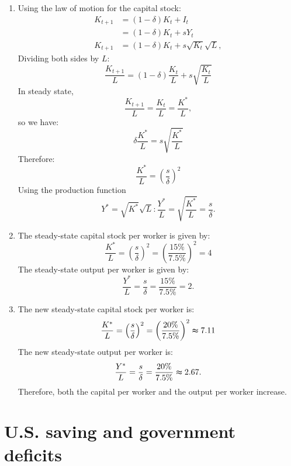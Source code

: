 \documentclass[]{book}
\theoremstyle{definition}
\theoremstyle{definition}
\theoremstyle{definition}
\theoremstyle{remark}
\begin{document}
\begin{enumerate}
\def\labelenumi{\arabic{enumi}.}
\item
  Using the law of motion for the capital stock: \[\begin{aligned}
  K_{t+1}&=(1-\delta)K_{t}+I_{t}\\
  &=(1-\delta)K_{t}+sY_{t}\\
  K_{t+1}&=(1-\delta)K_{t}+s\sqrt{K_{t}}\sqrt{L},
  \end{aligned}\] Dividing both sides by \(L\):
  \[\frac{K_{t+1}}{L}=(1-\delta)\frac{K_{t}}{L}+s\sqrt{\frac{K_{t}}{L}}\]
  In steady state,
  \[\frac{K_{t+1}}{L}=\frac{K_{t}}{L}=\frac{K^{*}}{L},\] so we have:
  \[\delta\frac{K^{*}}{L}=s\sqrt{\frac{K^{*}}{L}}\] Therefore:
  \[\frac{K^{*}}{L}=\left(\frac{s}{\delta}\right)^{2}\] Using the
  production function
  \[Y^{*}=\sqrt{K^{*}}\sqrt{L}:\frac{Y^{*}}{L}=\sqrt{\frac{K^{*}}{L}}=\frac{s}{\delta}.\]
\item
  The steady-state capital stock per worker is given by:
  \[\frac{K^{*}}{L}=\left(\frac{s}{\delta}\right)^{2}=\left(\frac{15\%}{7.5\%}\right)^{2}=4\]
  The steady-state output per worker is given by:
  \[\frac{Y^{*}}{L}=\frac{s}{\delta}=\frac{15\%}{7.5\%}=2.\]
\item
  The new steady-state capital stock per worker is:
  \[\frac{K^{*}}{L}=\left(\frac{s}{\delta}\right)^{2}=\left(\frac{20\%}{7.5\%}\right)^{2}\thickapprox7.11\]
  The new steady-state output per worker is:
  \[\frac{Y^{*}}{L}=\frac{s}{\delta}=\frac{20\%}{7.5\%}\thickapprox2.67.\]
  Therefore, both the capital per worker and the output per worker
  increase.
\end{enumerate}

\section*{U.S. saving and government
deficits}\label{u.s.-saving-and-government-deficits-1}
\end{document}
